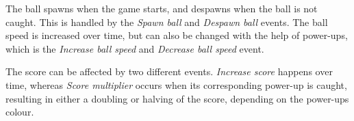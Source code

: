 The ball spawns when the game starts, and despawns when the ball is not caught.
This is handled by the \textit{Spawn ball} and \textit{Despawn ball} events.
The ball speed is increased over time, but can also be changed with the help of power-ups, which is the \textit{Increase ball speed} and \textit{Decrease ball speed} event.

The score can be affected by two different events.
\textit{Increase score} happens over time, whereas \textit{Score multiplier} occurs when its corresponding power-up is caught, resulting in either a doubling or halving of the score, depending on the power-ups colour.
